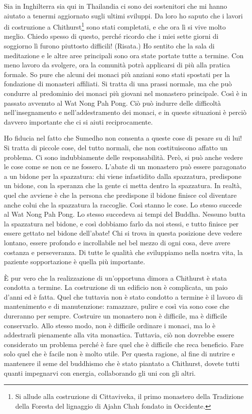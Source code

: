 Sia in Inghilterra sia qui in Thailandia ci sono dei sostenitori che mi
hanno aiutato a tenermi aggiornato sugli ultimi sviluppi. Da loro ho
saputo che i lavori di costruzione a Chithurst\footnote{Si allude alla
  costruzione di Cittaviveka, il primo monastero della Tradizione della
  Foresta del lignaggio di Ajahn Chah fondato in Occidente.} sono stati
completati, e che ora lì si vive molto meglio. Chiedo spesso di questo,
perché ricordo che i miei sette giorni di soggiorno lì furono piuttosto
difficili! (Risata.) Ho sentito che la sala di meditazione e le altre
aree principali sono ora state portate tutte a termine. Con meno lavoro
da svolgere, ora la comunità potrà applicarsi di più alla pratica
formale. So pure che alcuni dei monaci più anziani sono stati spostati
per la fondazione di monasteri affiliati. Si tratta di una prassi
normale, ma che può condurre al predominio dei monaci più giovani nel
monastero principale. Così è in passato avvenuto al Wat Nong Pah Pong.
Ciò può indurre delle difficoltà nell'insegnamento e nell'addestramento
dei monaci, e in queste situazioni è perciò davvero importante che ci si
aiuti reciprocamente.

Ho fiducia nel fatto che Sumedho non consenta a queste cose di pesare su
di lui! Si tratta di piccole cose, del tutto normali, che non
costituiscono affatto un problema. Ci sono indubbiamente delle
responsabilità. Però, si può anche vedere le cose come se non ce ne
fossero. L'abate di un monastero può essere paragonato a un bidone per
la spazzatura: chi viene infastidito dalla spazzatura, predispone un
bidone, con la speranza che la gente ci metta dentro la spazzatura. In
realtà, quel che avviene è che la persona che predispone il bidone
finisce col diventare anche colui che la spazzatura la raccoglie. Così
stanno le cose. Lo stesso succede al Wat Nong Pah Pong. Lo stesso
succedeva ai tempi del Buddha. Nessuno butta la spazzatura nel bidone, e
così dobbiamo farlo da noi stessi, e tutto finisce per essere gettato
nel bidone dell'abate! Chi si trova in questa posizione deve vedere
lontano, essere profondo e incrollabile nel bel mezzo di ogni cosa, deve
avere costanza e perseveranza. Di tutte le qualità che sviluppiamo nella
nostra vita, la paziente sopportazione è quella più importante.

È pur vero che la realizzazione di un'opportuna dimora a Chithurst è
stata condotta a termine. La costruzione di un edificio non è
complicata, un paio d'anni ed è fatta. Quel che tuttavia non è stato
condotto a termine è il lavoro di mantenimento e di manutenzione:
ramazzare, pulire e così via sono cose che dureranno per sempre.
Costruire un monastero non è difficile, ma è difficile conservarlo. Allo
stesso modo, non è difficile ordinare i monaci, ma lo è addestrarli
pienamente alla vita monastica. Tuttavia, ciò non dovrebbe essere
considerato un problema perché è fare quel che è difficile che reca
beneficio. Fare solo quel che è facile non è molto utile. Per questa
ragione, al fine di nutrire e mantenere il seme del buddhismo che è
stato piantato a Chithurst, dovete tutti quanti impegnarvi con energia,
collaborando gli uni con gli altri.

